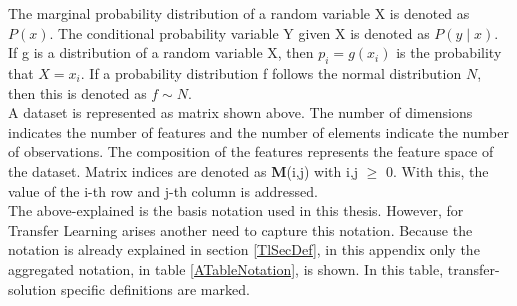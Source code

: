 The marginal probability distribution of a random variable X is denoted as $P(x)$.
The conditional probability variable Y given X is denoted as $P(y \mid x)$.
If g is a distribution of a random variable X, then $p_i=g(x_i)$ is the probability that $X=x_i$.
If a probability distribution f follows the normal distribution $N$, then this is denoted as $f\sim N$.\\
A dataset is represented as matrix shown above.
The number of dimensions indicates the number of features and the number of elements indicate the number of observations.
The composition of the features represents the feature space of the dataset.
Matrix indices are denoted as \textbf{M}(i,j) with i,j $\ge$ 0.
With this, the value of the i-th row and j-th column is addressed.\\
The above-explained is the basis notation used in this thesis. 
However, for Transfer Learning arises another need to capture this notation.
Because the notation is already explained in section \ref{TlSecDef}, in this appendix only the aggregated notation, in table \ref{ATableNotation}, is shown.
In this table, transfer-solution specific definitions are marked.
